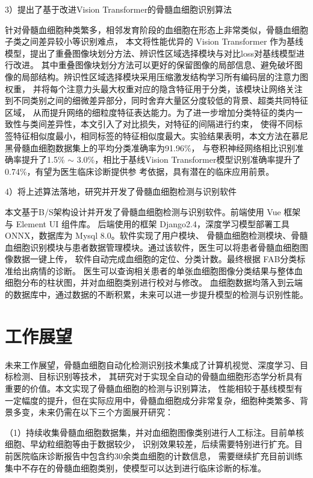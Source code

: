3）提出了基于改进Vision Transformer的骨髓血细胞识别算法

针对骨髓血细胞种类繁多，相邻发育阶段的血细胞在形态上非常类似，骨髓血细胞子类之间差异较小等识别难点，
本文将性能优异的 Vision Transformer 作为基线模型，提出了重叠图像块划分方法、辨识性区域选择模块与对比loss对基线模型进行改进。
其中重叠图像块划分方法可以更好的保留图像的局部信息、避免破坏图像的局部结构。辨识性区域选择模块采用压缩激发结构学习所有编码层的注意力图权重，
并将每个注意力头最大权重对应的隐含特征用于分类，该模块让网络关注到不同类别之间的细微差异部分，同时舍弃大量区分度较低的背景、超类共同特征区域\cite{SWGC202206005}，
从而提升网络的细粒度特征表达能力。为了进一步增加分类特征的类内一致性与类间差异性，本文引入了对比损失，对特征的间隔进行约束，
使得不同标签特征相似度最小，相同标签的特征相似度最大。实验结果表明，本文方法在慕尼黑骨髓血细胞数据集上的平均分类准确率为91.96\%，
与卷积神经网络相比识别准确率提升了1.5\% $\sim$ 3.0\%，相比于基线Vision Transformer模型识别准确率提升了0.74\%，有望为医生临床诊断提供参
考依据，具有潜在的临床应用前景。

4）将上述算法落地，研究并开发了骨髓血细胞检测与识别软件

本文基于B/S架构设计并开发了骨髓血细胞检测与识别软件。前端使用 Vue 框架与 Element UI 组件库。
后端使用的框架 Django2.4，深度学习模型部署工具 ONNX，数据库为 Mysql 8.0。软件实现了用户模块、
骨髓血细胞检测模块、骨髓血细胞识别模块与患者数据管理模块。通过该软件，医生可以将患者骨髓血细胞图像数据一键上传，
软件自动完成血细胞的定位、分类计数。最终根据 FAB分类标准给出病情的诊断。
医生可以查询相关患者的单张血细胞图像分类结果与整体血细胞分布的柱状图，并对血细胞类别进行校对与修改。
血细胞数据均落入到云端的数据库中，通过数据的不断积累，未来可以进一步提升模型的检测与识别性能。

\section{工作展望}

未来工作展望，骨髓血细胞自动化检测识别技术集成了计算机视觉、深度学习、目标检测、目标识别等技术，
其研究对于实现全自动的骨髓血细胞形态学分析具有重要的价值。本文实现了骨髓血细胞的检测与识别算法，
性能相较于基线模型有一定幅度的提升，但在实际应用中，骨髓血细胞成分非常复杂，细胞种类繁多、背景多变，未来仍需在以下三个方面展开研究：

（1）持续收集骨髓血细胞数据集，并对血细胞图像类别进行人工标注。目前单核细胞、早幼粒细胞等由于数据较少，
识别效果较差，后续需要特别进行扩充。目前医院临床诊断报告中包含约30余类血细胞的计数信息，
需要继续扩充目前训练集中不存在的骨髓血细胞类别，使模型可以达到进行临床诊断的标准。

